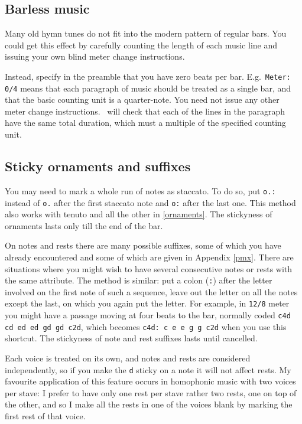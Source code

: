 \documentclass[11pt]{article}
\begin{document}
\subsection{Barless music}   

Many old hymn tunes do not fit into the modern pattern of regular bars.
You could get this effect by carefully counting the length of each music
line and issuing your own blind meter 
change instructions.

Instead, specify in the preamble that you have zero beats per bar.  
E.g.~\verb"Meter: 0/4" means that each paragraph of music
should be treated as a single bar, and that the basic counting unit is
a quarter-note.  You need not issue any other meter change instructions.
\MTx\ will check that each of the lines in the paragraph have the same total 
duration, which must a multiple of the specified counting unit.

\subsection{Sticky ornaments and suffixes}

You may need to mark a whole run of notes as staccato.  To do so,
put \verb'o.:' instead of \verb'o.' after the first staccato note and
\verb'o:' after the last one.  This method also works with tenuto
and all the other  in \ref{ornaments}.  
The stickyness of ornaments lasts only till the end of the bar.

On notes and rests there are many possible suffixes, some of which you have 
already encountered and some of which are given in Appendix \ref{pmx}.  There 
are situations where you might wish to have several consecutive notes or rests 
with the same attribute.  The method is similar: put a colon (\texttt{:}) 
after the letter involved on the first note of such a sequence,  leave out the 
letter on all the notes except the last, on which you again put the 
letter.  For example, in \verb'12/8' meter you might have a passage moving at 
four beats to the bar, normally coded \verb"c4d cd ed ed gd gd c2d", which 
becomes \verb"c4d: c e e g g c2d" when you use this shortcut.  The stickyness 
of note and rest suffixes lasts until cancelled. 

Each voice is treated on its own, and notes and rests are considered 
independently, so if you make the \verb'd' sticky on a note it will not affect 
rests.  My favourite application of this feature occurs in homophonic music 
with two voices per stave: I prefer to have only one rest per stave rather two 
rests, one on top of the other, and so I make all the rests in one of the 
voices blank by marking the first rest of that voice. 
\end{document}
